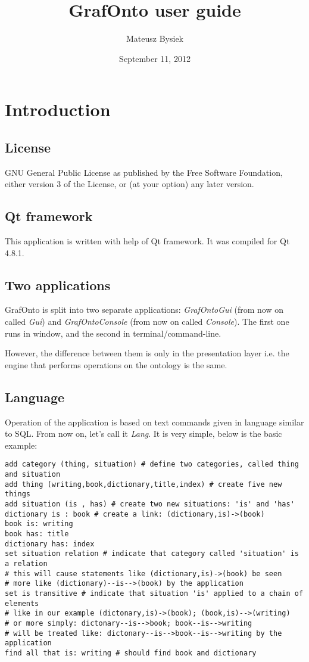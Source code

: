 \documentclass{article}
\begin{document}
\title{GrafOnto user guide}
\date{September 11, 2012}
\author{Mateusz Bysiek}
\maketitle

\tableofcontents


\pagebreak[4]


\section{Introduction}

\subsection{License}
GNU General Public License as published by the Free Software Foundation, either version 3 of the
License, or (at your option) any later version.

\subsection{Qt framework}
This application is written with help of Qt framework. It was compiled for Qt 4.8.1.

\subsection{Two applications}
GrafOnto is split into two separate applications: \textit{GrafOntoGui} (from now on called
\textit{Gui}) and \textit{GrafOntoConsole} (from now on called \textit{Console}).
The first one runs in window, and the second in terminal/command-line.

However, the difference between them is only in the presentation layer i.e. the engine that performs
operations on the ontology is the same.

\subsection{Language}
Operation of the application is based on text commands given in language similar to SQL. 
From now on, let's call it \textit{Lang}. It is very simple, below is the basic example:
\begin{verbatim}
add category (thing, situation) # define two categories, called thing and situation
add thing (writing,book,dictionary,title,index) # create five new things 
add situation (is , has) # create two new situations: 'is' and 'has'
dictionary is : book # create a link: (dictionary,is)->(book)
book is: writing
book has: title
dictionary has: index
set situation relation # indicate that category called 'situation' is a relation
# this will cause statements like (dictionary,is)->(book) be seen 
# more like (dictionary)--is-->(book) by the application
set is transitive # indicate that situation 'is' applied to a chain of elements
# like in our example (dictonary,is)->(book); (book,is)-->(writing) 
# or more simply: dictonary--is-->book; book--is-->writing
# will be treated like: dictonary--is-->book--is-->writing by the application
find all that is: writing # should find book and dictionary
\end{verbatim}
\end{document}
